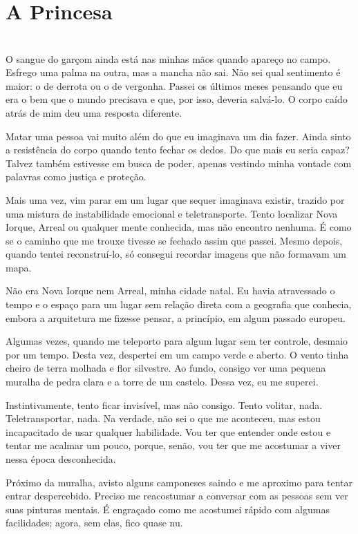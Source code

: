\newpage
\ifdefined\useChapters
\chapter{A Princesa}
\else
\chapter{}
\fi

O sangue do garçom ainda está nas minhas mãos quando apareço no campo. Esfrego uma palma na outra, mas a mancha não sai. Não sei qual sentimento é maior: o de derrota ou o de vergonha. Passei os últimos meses pensando que eu era o bem que o mundo precisava e que, por isso, deveria salvá-lo. O corpo caído atrás de mim deu uma resposta diferente.

Matar uma pessoa vai muito além do que eu imaginava um dia fazer. Ainda sinto a resistência do corpo quando tento fechar os dedos. Do que mais eu seria capaz? Talvez também estivesse em busca de poder, apenas vestindo minha vontade com palavras como justiça e proteção.

Mais uma vez, vim parar em um lugar que sequer imaginava existir, trazido por uma mistura de instabilidade emocional e teletransporte. Tento localizar Nova Iorque, Arreal ou qualquer mente conhecida, mas não encontro nenhuma. É como se o caminho que me trouxe tivesse se fechado assim que passei. Mesmo depois, quando tentei reconstruí-lo, só consegui recordar imagens que não formavam um mapa.

Não era Nova Iorque nem Arreal, minha cidade natal. Eu havia atravessado o tempo e o espaço para um lugar sem relação direta com a geografia que conhecia, embora a arquitetura me fizesse pensar, a princípio, em algum passado europeu.

Algumas vezes, quando me teleporto para algum lugar sem ter controle, desmaio por um tempo. Desta vez, despertei em um campo verde e aberto. O vento tinha cheiro de terra molhada e flor silvestre. Ao fundo, consigo ver uma pequena muralha de pedra clara e a torre de um castelo. Dessa vez, eu me superei.

Instintivamente, tento ficar invisível, mas não consigo. Tento volitar, nada. Teletransportar, nada. Na verdade, não sei o que me aconteceu, mas estou incapacitado de usar qualquer habilidade. Vou ter que entender onde estou e tentar me acalmar um pouco, porque, senão, vou ter que me acostumar a viver nessa época desconhecida.

Próximo da muralha, avisto alguns camponeses saindo e me aproximo para tentar entrar despercebido. Preciso me reacostumar a conversar com as pessoas sem ver suas pinturas mentais. É engraçado como me acostumei rápido com algumas facilidades; agora, sem elas, fico quase nu.

